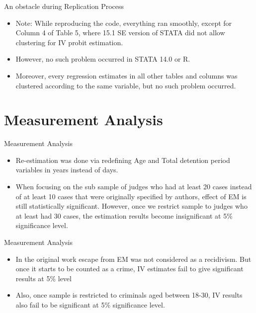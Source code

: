 \documentclass{beamer}
\begin{document}
\begin{frame}{An obstacle during Replication Process}
\begin{itemize}
\setlength\itemsep{2em}
      \item  Note: While reproducing the code, everything ran smoothly, except for Column 4 of Table 5, where 15.1 SE version of STATA did not allow clustering for IV probit estimation.
    \item However, no such problem occurred in STATA 14.0 or R.
    
   \item  Moreover, every regression estimates in all other tables and columns was clustered according to the same variable, but no such problem occurred.
    \end{itemize}
\end{frame}
\section{Measurement Analysis}
\begin{frame}{Measurement Analysis}
    \begin{itemize}
    \setlength\itemsep{2em}
        \item Re-estimation was done via redefining Age and Total detention period variables in years instead of days.
        
        \item When focusing on the sub sample of judges who had at least 20 cases instead of at least 10 cases that were originally specified by authors, effect of EM is still statistically significant. However, once we restrict sample to judges who at least had 30 cases, the estimation results become insignificant at 5\% significance level.
        
           \end{itemize}
\end{frame}
\begin{frame}{Measurement Analysis}
    \begin{itemize}
    \setlength\itemsep{2em}
        
        \item In the original work escape from EM was not considered as a recidivism. But once it starts to be counted as a crime, IV estimates fail to give significant results at 5\% level 
        \item Also, once sample is restricted to criminals aged between 18-30, IV results also fail to be significant at 5\% significance level.
        
    \end{itemize}
\end{frame}
\end{document}
